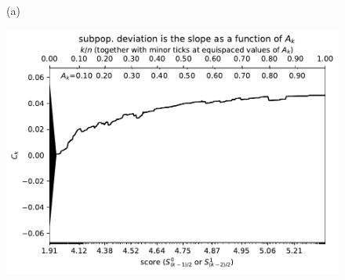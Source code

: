 \documentclass{article}
\newlength{\vertsep}
\newlength{\imsize}
\begin{document}
\begin{figure}
\begin{centering}

(a)
\parbox{\imsize}{\includegraphics[width=\imsize]
{../codes/weighted/County_of_Riverside_vs_Butte-LNGI/cumulative.pdf}}

\vspace{\vertsep}


\end{centering}
\end{figure}
\end{document}
